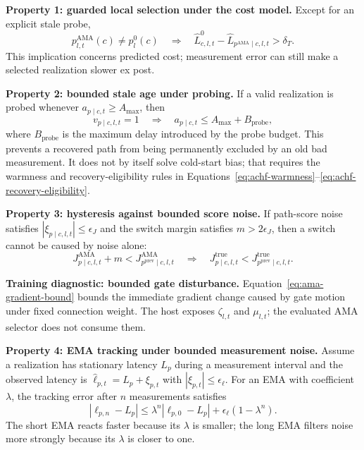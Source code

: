 \documentclass{article}
\newcommand{\ama}{\textsc{AMA}}
\begin{document}
\textbf{Property 1: guarded local selection under the cost model.}
Except for an explicit stale probe,
\begin{equation}
p^{\mathrm{AMA}}_{l,t}(c)\ne p_l^0(c)
\quad\Rightarrow\quad
\widehat L^0_{c,l,t}
-\widehat L_{p^{\mathrm{AMA}}\mid c,l,t}
>
\delta_T .
\label{eq:ama-no-negative-selection}
\end{equation}
This implication concerns predicted cost; measurement error can still make a
selected realization slower ex post.

\textbf{Property 2: bounded stale age under probing.}
If a valid realization is probed whenever $a_{p\mid c,t}\ge A_{\max}$, then
\begin{equation}
v_{p\mid c,l,t}=1
\quad\Rightarrow\quad
a_{p\mid c,t}\le A_{\max}+B_{\mathrm{probe}},
\label{eq:ama-stale-bound}
\end{equation}
where $B_{\mathrm{probe}}$ is the maximum delay introduced by the probe budget.
This prevents a recovered path from being permanently excluded by an old bad
measurement. It does not by itself solve cold-start bias; that requires the
warmness and recovery-eligibility rules in
Equations~\eqref{eq:achf-warmness}--\eqref{eq:achf-recovery-eligibility}.

\textbf{Property 3: hysteresis against bounded score noise.}
If path-score noise satisfies $|\xi_{p\mid c,l,t}|\le\epsilon_J$ and the switch
margin satisfies $m>2\epsilon_J$, then a switch cannot be caused by noise
alone:
\begin{equation}
J^{\mathrm{AMA}}_{p\mid c,l,t}+m
<
J^{\mathrm{AMA}}_{p^{\mathrm{prev}}\mid c,l,t}
\quad\Rightarrow\quad
J^{\mathrm{true}}_{p\mid c,l,t}
<
J^{\mathrm{true}}_{p^{\mathrm{prev}}\mid c,l,t}.
\label{eq:ama-noise-margin}
\end{equation}

\textbf{Training diagnostic: bounded gate disturbance.}
Equation~\eqref{eq:ama-gradient-bound} bounds the immediate gradient change
caused by gate motion under fixed connection weight. The host exposes
$\zeta_{l,t}$ and $\mu_{l,t}$; the evaluated \ama{} selector does not consume
them.

\textbf{Property 4: EMA tracking under bounded measurement noise.}
Assume a realization has stationary latency $L_p$ during a measurement interval and
the observed latency is $\hat{\ell}_{p,t}=L_p+\xi_{p,t}$ with
$|\xi_{p,t}|\le \epsilon_{\ell}$. For an EMA with coefficient $\lambda$, the
tracking error after $n$ measurements satisfies
\begin{equation}
\left|
\ell_{p,n}-L_p
\right|
\le
\lambda^n
\left|
\ell_{p,0}-L_p
\right|
+
\epsilon_{\ell}(1-\lambda^n).
\label{eq:ama-ema-error-bound}
\end{equation}
The short EMA reacts faster because its $\lambda$ is smaller; the long EMA
filters noise more strongly because its $\lambda$ is closer to one.
\end{document}
